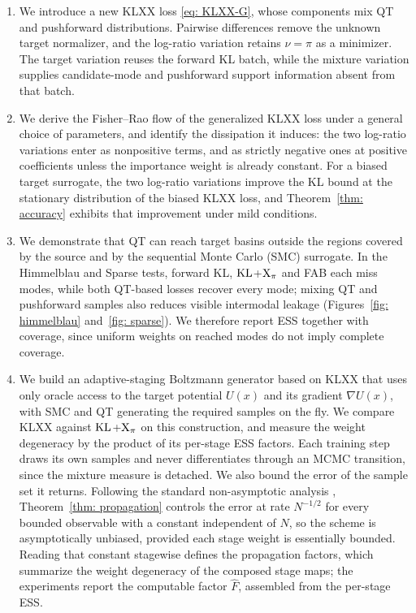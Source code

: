 \documentclass{article}
\begin{document}
\begin{enumerate}
	\setlength{\itemsep}{0pt}
	\item We introduce a new KLXX loss \eqref{eq: KLXX-G}, whose components mix QT and pushforward distributions. Pairwise differences remove the unknown target normalizer, and the log-ratio variation retains $\nu=\pi$ as a minimizer. The target variation reuses the forward KL batch, while the mixture variation supplies candidate-mode and pushforward support information absent from that batch.

	\item We derive the Fisher--Rao flow of the generalized KLXX loss under a general choice of parameters, and identify the dissipation it induces: the two log-ratio variations enter as nonpositive terms, and as strictly negative ones at positive coefficients unless the importance weight is already constant. For a biased target surrogate, the two log-ratio variations improve the KL bound at the stationary distribution of the biased KLXX loss, and Theorem~\ref{thm: accuracy} exhibits that improvement under mild conditions.

	\item We demonstrate that QT can reach target basins outside the regions covered by the source and by the sequential Monte Carlo (SMC) surrogate. In the Himmelblau and Sparse tests, forward KL, $\mathrm{KL}$+$\mathrm{X}_\pi$ and FAB each miss modes, while both QT-based losses recover every mode; mixing QT and pushforward samples also reduces visible intermodal leakage (Figures~\ref{fig: himmelblau} and~\ref{fig: sparse}). We therefore report ESS together with coverage, since uniform weights on reached modes do not imply complete coverage.

	\item We build an adaptive-staging Boltzmann generator based on KLXX that uses only oracle access to the target potential $U(x)$ and its gradient $\nabla U(x)$, with SMC and QT generating the required samples on the fly. We compare KLXX against $\mathrm{KL}$+$\mathrm{X}_\pi$ on this construction, and measure the weight degeneracy by the product of its per-stage ESS factors. Each training step draws its own samples and never differentiates through an MCMC transition, since the mixture measure is detached. We also bound the error of the sample set it returns. Following the standard non-asymptotic analysis \citep{delmoral2004feynman,chopin2020introduction}, Theorem~\ref{thm: propagation} controls the error at rate $N^{-1/2}$ for every bounded observable with a constant independent of $N$, so the scheme is asymptotically unbiased, provided each stage weight is essentially bounded. Reading that constant stagewise defines the propagation factors, which summarize the weight degeneracy of the composed stage maps; the experiments report the computable factor $\hat F$, assembled from the per-stage ESS.
\end{enumerate}
\end{document}
